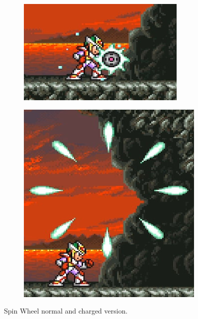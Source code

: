 \begin{figure}[htp]
	\centering
	\begin{subfigure}{0.4\linewidth}
		\includegraphics[width=\linewidth]{figures/X2/weapons/S_wheel_1.png}	
	\end{subfigure}
	\begin{subfigure}{0.3\linewidth}
		\centering
		\includegraphics[width=\linewidth]{figures/X2/weapons/S_wheel_2.png}	
	\end{subfigure}
	\caption{Spin Wheel normal and charged version.}
\end{figure}

